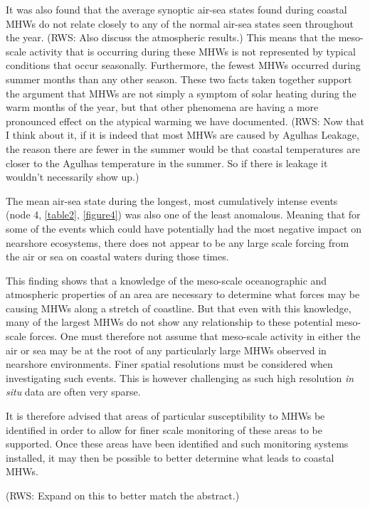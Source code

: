 \documentclass[a4paper,10pt,review]{elsarticle}
\begin{document}
It was also found that the average synoptic air-sea states found during coastal MHWs do not relate closely to any of the normal air-sea states seen throughout the year. (RWS: Also discuss the atmospheric results.) This means that the meso-scale activity that is occurring during these MHWs is not represented by typical conditions that occur seasonally. Furthermore, the fewest MHWs occurred during summer months than any other season. These two facts taken together support the argument that MHWs are not simply a symptom of solar heating during the warm months of the year, but that other phenomena are having a more pronounced effect on the atypical warming we have documented. (RWS: Now that I think about it, if it is indeed that most MHWs are caused by Agulhas Leakage, the reason there are fewer in the summer would be that coastal temperatures are closer to the Agulhas temperature in the summer. So if there is leakage it wouldn’t necessarily show up.)

The mean air-sea state during the longest, most cumulatively intense events (node 4, \cref{table2}, \cref{figure4}) was also one of the least anomalous. Meaning that for some of the events which could have potentially had the most negative impact on nearshore ecosystems, there does not appear to be any large scale forcing from the air or sea on coastal waters during those times.

This finding shows that a knowledge of the meso-scale oceanographic and atmospheric properties of an area are necessary to determine what forces may be causing MHWs along a stretch of coastline. But that even with this knowledge, many of the largest MHWs do not show any relationship to these potential meso-scale forces. One must therefore not assume that meso-scale activity in either the air or sea may be at the root of any particularly large MHWs observed in nearshore environments. Finer spatial resolutions must be considered when investigating such events. This is however challenging as such high resolution \emph{in situ} data are often very sparse.

It is therefore advised that areas of particular susceptibility to MHWs be identified in order to allow for finer scale monitoring of these areas to be supported. Once these areas have been identified and such monitoring systems installed, it may then be possible to better determine what leads to coastal MHWs. 

(RWS: Expand on this to better match the abstract.)
\end{document}
